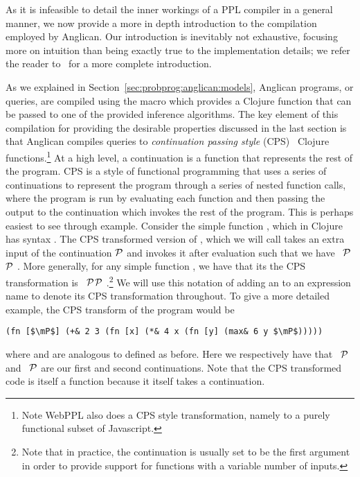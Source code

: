 As it is infeasible to detail the inner workings of a PPL compiler in a general
manner, we now provide a more in depth introduction to the compilation
employed by Anglican.  Our introduction is inevitably not exhaustive, focusing more on
intuition than being exactly true to the implementation details; we refer the reader
to~\citep{tolpin2016design} for a more complete introduction.

As we explained in Section~\ref{sec:probprog:anglican:models},
Anglican programs, or queries, are compiled using the macro \query which provides a
Clojure function that can be passed to one of the provided inference algorithms.
The key element of this compilation for providing the desirable properties discussed
in the last section is that
Anglican compiles queries to \emph{continuation passing style} (CPS)~\citep{appel1989continuation}
Clojure functions.\footnote{Note WebPPL also does a CPS style transformation, 
	namely to a purely functional subset of Javascript.}
At a high level, a continuation is a function that represents the rest of the
program.  CPS is a style of functional programming that uses a series of continuations
to represent the program through a series of nested function calls, where the program
is run by evaluating each function and then passing the output to the continuation
which invokes the rest of the program.  This is perhaps easiest to see through
example.  Consider the simple function \clj{+}, which in Clojure has syntax .  The
CPS transformed version of \clj{+}, which we will call \clj{+&} takes an extra input
of the continuation $\mathcal{P}$ and invokes it after evaluation such that we have
\clj{(defn +& [a b } ~$\mathcal{P}$\clj{] (}$\mathcal{P}$ .  More generally, for any simple function , we have
that its the CPS transformation is \clj{(defn f& [args} ~$\mathcal{P}$\clj{] (}$\mathcal{P}$ .\footnote{Note that
	in practice, the continuation is usually set to be the first argument in order to provide support
	for functions with a variable number of inputs.}
  We 
will use this notation of adding an \clj{&} to an expression name to denote its CPS transformation throughout.
To give a more detailed example, the CPS transform of the program  would be
\begin{lstlisting}[basicstyle=\ttfamily\small,frame=none]
  (fn [$\mP$] (+& 2 3 (fn [x] (*& 4 x (fn [y] (max& 6 y $\mP$)))))
\end{lstlisting}\vspace{-8pt}
where \clj{*&} and
 are analogous to \clj{+&} defined as before.
Here we respectively have that ~$\mathcal{P}$\clj{))))} and
~$\mathcal{P}$\clj{))} are our first and second continuations.  Note that the CPS 
transformed code is itself a function because
it itself takes a continuation.  

